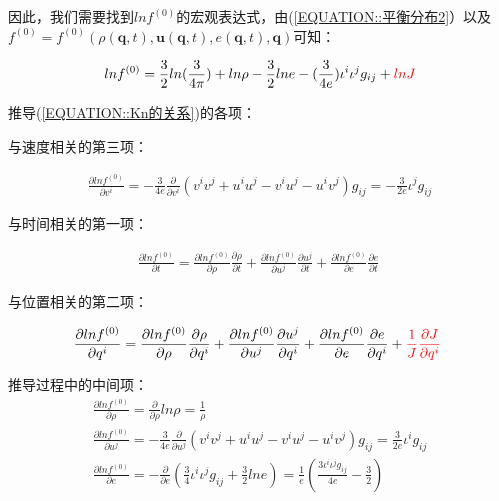 \documentclass[LBMDerivation.tex]{subfiles}
\begin{document}
因此，我们需要找到$ln f^{(0)}$的宏观表达式，由(\ref{EQUATION::平衡分布2}）以及$f^{(0)}=f^{(0)}(\rho(\boldsymbol{q},t),\boldsymbol{u}(\boldsymbol{q},t),e(\boldsymbol{q},t),\boldsymbol{q})$可知：


\begin{equation}
  ln f^{(0)} = \frac{3}{2} ln(\frac{3}{4\pi}) + ln \rho - \frac{3}{2} ln e - (\frac{3}{4e}){\iota^i\iota^jg_{ij}}+ {\color{red} ln J}
\end{equation}


推导(\ref{EQUATION::Kn的关系})的各项：

与速度相关的第三项：

\begin{equation}
  \begin{gathered}
    \frac{\partial ln f^{(0)}}{\partial v^i} =
    -\frac{3}{4e} \frac{\partial}{\partial v^i}(v^iv^j+u^iu^j-v^iu^j-u^iv^j)g_{ij}=-\frac{3}{2e}\iota^j g_{ij}
  \end{gathered}
\end{equation}

与时间相关的第一项：

\begin{equation}
  \begin{gathered}
    \frac{\partial ln f^{(0)}}{\partial t} =
    \frac{\partial ln f^{(0)}}{\partial \rho} \frac{\partial \rho}{\partial t} +     \frac{\partial ln f^{(0)}}{\partial u^j} \frac{\partial u^j}{\partial t} +     \frac{\partial ln f^{(0)}}{\partial e} \frac{\partial e}{\partial t}
  \end{gathered}
  \label{EQUATION::推导lnt} ~
\end{equation}



与位置相关的第二项：

\begin{equation}
  \begin{gathered}
    \frac{\partial ln f^{(0)}}{\partial q^i} =
    \frac{\partial ln f^{(0)}}{\partial \rho} \frac{\partial \rho}{\partial q^i} +     \frac{\partial ln f^{(0)}}{\partial u^j} \frac{\partial u^j}{\partial q^i} +     \frac{\partial ln f^{(0)}}{\partial e} \frac{\partial e}{\partial q^i} + {\color{red} \frac{1}{J}\frac{\partial J}{\partial q^i}}
  \end{gathered}
  \label{EQUATION::推导lnxi} ~
\end{equation}



推导过程中的中间项：
\begin{equation}
  \begin{gathered}
    \frac{\partial ln f^{(0)}}{\partial \rho}=\frac{\partial}{\partial \rho}ln \rho=\frac{1}{\rho} \\
    \frac{\partial ln f^{(0)}}{\partial u^j}=-\frac{3}{4e} \frac{\partial}{\partial u^j}(v^iv^j+u^iu^j-v^iu^j-u^iv^j)g_{ij}=\frac{3}{2e}\iota^i g_{ij} \\
    \frac{\partial ln f^{(0)}}{\partial e}=-\frac{\partial}{\partial e}(\frac{3}{4}{\iota^i\iota^jg_{ij}}+\frac{3}{2} ln e )=\frac{1}{e}(\frac{3 {\iota^i\iota^jg_{ij}}}{4e}-\frac{3}{2})
  \end{gathered}
\end{equation}
\end{document}
